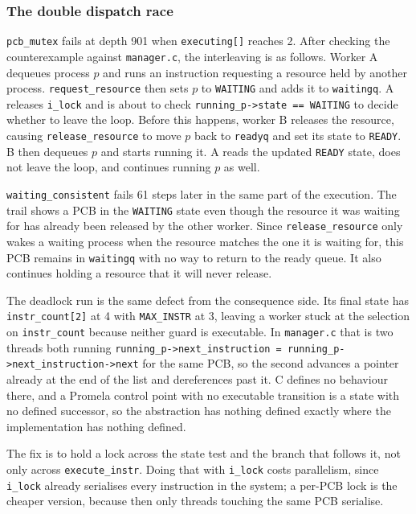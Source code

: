 \documentclass[10pt,a4paper]{article}
\newcommand{\code}[1]{\texttt{#1}}
\begin{document}
\subsubsection*{The double dispatch race}

\code{pcb\_mutex} fails at depth 901 when \code{executing[]} reaches 2. After 
checking the counterexample against \code{manager.c}, the interleaving is as 
follows. Worker A dequeues process $p$ and runs an instruction requesting a 
resource held by another process. \code{request\_resource} then sets $p$ to 
\code{WAITING} and adds it to \code{waitingq}. A releases \code{i\_lock} and 
is about to check \code{running\_p->state == WAITING} to decide whether to 
leave the loop. Before this happens, worker B releases the resource, causing 
\code{release\_resource} to move $p$ back to \code{readyq} and set its state to 
\code{READY}. B then dequeues $p$ and starts running it. A reads the updated 
\code{READY} state, does not leave the loop, and continues running $p$ as well.

\code{waiting\_consistent} fails 61 steps later in the same part of the execution. 
The trail shows a PCB in the \code{WAITING} state even though the resource it 
was waiting for has already been released by the other worker. Since 
\code{release\_resource} only wakes a waiting process when the resource
matches the one it is waiting for, this PCB remains in \code{waitingq} with 
no way to return to the ready queue. It also continues holding a resource 
that it will never release.

The deadlock run is the same defect from the consequence side. Its final state
has \code{instr\_count[2]} at 4 with \code{MAX\_INSTR} at 3, leaving a worker
stuck at the selection on \code{instr\_count} because neither guard is
executable. In \code{manager.c} that is two threads both running
\code{running\_p->next\_instruction = running\_p->next\_instruction->next} for
the same PCB, so the second advances a pointer already at the end of the list
and dereferences past it. C defines no behaviour there, and a Promela control
point with no executable transition is a state with no defined successor, so
the abstraction has nothing defined exactly where the implementation has
nothing defined.

The fix is to hold a lock across the state test and the branch that follows
it, not only across \code{execute\_instr}. Doing that with \code{i\_lock}
costs parallelism, since \code{i\_lock} already serialises every instruction
in the system; a per-PCB lock is the cheaper version, because then only
threads touching the same PCB serialise.
\end{document}
